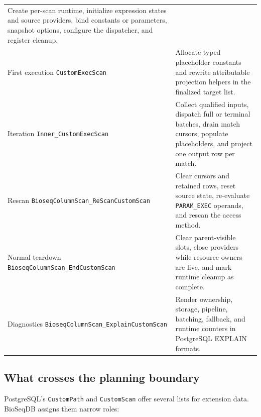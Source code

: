 \begin{table}[htbp]
\begin{tabular}{@{}p{}p{}@{}}
Create per-scan runtime, initialize expression states and source providers,
bind constants or parameters, snapshot options, configure the dispatcher,
and register cleanup. \\
First execution\newline
\texttt{CustomExecScan} &
Allocate typed placeholder constants and rewrite attributable projection
helpers in the finalized target list. \\
Iteration\newline
\texttt{Inner\_CustomExecScan} &
Collect qualified inputs, dispatch full or terminal batches, drain match
cursors, populate placeholders, and project one output row per match. \\
Rescan\newline
\texttt{BioseqColumnScan\_}\allowbreak\texttt{ReScanCustomScan} &
Clear cursors and retained rows, reset source state, re-evaluate
\texttt{PARAM\_EXEC} operands, and rescan the access method. \\
Normal teardown\newline
\texttt{BioseqColumnScan\_}\allowbreak\texttt{EndCustomScan} &
Clear parent-visible slots, close providers while resource owners are live,
and mark runtime cleanup as complete. \\
Diagnostics\newline
\texttt{BioseqColumnScan\_}\allowbreak\texttt{ExplainCustomScan} &
Render ownership, storage, pipeline, batching, fallback, and runtime
counters in PostgreSQL EXPLAIN formats. \\
\bottomrule
\end{tabular}
\end{table}

\subsection{What crosses the planning boundary}

PostgreSQL's \texttt{CustomPath} and \texttt{CustomScan} offer several lists
for extension data.  BioSeqDB assigns them narrow roles:

